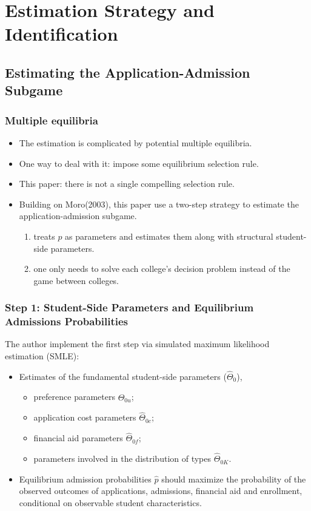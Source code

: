 \documentclass[10pt]{beamer}
\begin{document}
\section[Estimation Strategy]{Estimation Strategy and Identification}
\subsection{Estimating the Application-Admission Subgame}
\begin{frame}[c]\frametitle{Multiple equilibria}
\begin{itemize}
    \item The estimation is complicated by potential multiple equilibria.
    \item One way to deal with it: impose some equilibrium selection rule.
    \item This paper: there is not a single compelling selection rule.
    \item Building on Moro(2003), this paper use a two-step strategy to estimate the application-admission subgame.
    \begin{enumerate}
        \item  treats $p$ as parameters and estimates them along with structural student-side parameters.
        \item   one only needs to solve each college's decision problem instead of the game between colleges.
    \end{enumerate}
\end{itemize}
\end{frame}


\begin{frame}[c]\frametitle{Step 1: Student-Side Parameters and Equilibrium Admissions Probabilities}
The author  implement the first step via \alert{simulated maximum likelihood estimation (SMLE)}:
\begin{itemize}
    \item Estimates of the fundamental student-side parameters ($\widehat{\Theta}_{0}$),
    \begin{itemize}
        \item  preference parameters $\widehat{\Theta}_{0u}$;
        \item  application cost parameters $\widehat{\Theta}_{0c}$;
        \item  financial aid parameters $\widehat{\Theta}_{0f}$;
        \item  parameters involved in the distribution of types $\widehat{\Theta}_{0K}$.
    \end{itemize}
    \item Equilibrium admission probabilities $\hat{p}$ should maximize the probability of the observed outcomes of applications, admissions, financial aid and enrollment, conditional on observable student characteristics.
\end{itemize}

\end{frame}
\end{document}
